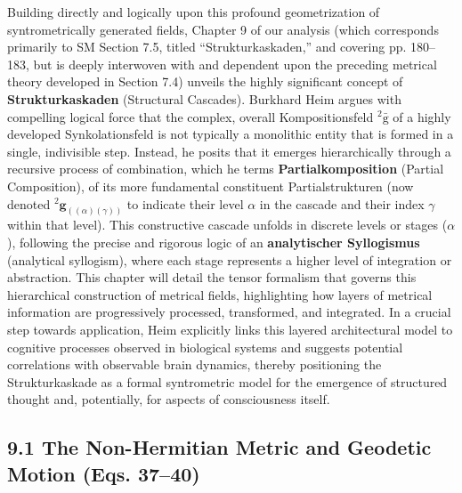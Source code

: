 \documentclass[12pt]{article}
\newcommand{\q}[1]{\enquote{#1}}
\newcommand{\kompositionsfeld}{{}^2\bar{\mathrm{g}}}
\newcommand{\partialstruktur}[1]{{}^2\mathbf{g}_{(#1)}}
\newcommand{\kaskadenstufe}{\alpha}
\begin{document}
Building directly and logically upon this profound geometrization of syntrometrically generated fields, Chapter 9 of our analysis (which corresponds primarily to SM Section 7.5, titled \q{Strukturkaskaden,} and covering pp. 180–183, but is deeply interwoven with and dependent upon the preceding metrical theory developed in Section 7.4) unveils the highly significant concept of \textbf{Strukturkaskaden} (Structural Cascades). Burkhard Heim argues with compelling logical force that the complex, overall Kompositionsfeld \( \kompositionsfeld \) of a highly developed Synkolationsfeld is not typically a monolithic entity that is formed in a single, indivisible step. Instead, he posits that it emerges hierarchically through a recursive process of combination, which he terms \textbf{Partialkomposition} (Partial Composition), of its more fundamental constituent Partialstrukturen (now denoted \( \partialstruktur{(\alpha)(\gamma)} \) to indicate their level \( \alpha \) in the cascade and their index \( \gamma \) within that level). This constructive cascade unfolds in discrete levels or stages (\(\kaskadenstufe\)), following the precise and rigorous logic of an \textbf{analytischer Syllogismus} (analytical syllogism), where each stage represents a higher level of integration or abstraction. This chapter will detail the tensor formalism that governs this hierarchical construction of metrical fields, highlighting how layers of metrical information are progressively processed, transformed, and integrated. In a crucial step towards application, Heim explicitly links this layered architectural model to cognitive processes observed in biological systems and suggests potential correlations with observable brain dynamics, thereby positioning the Strukturkaskade as a formal syntrometric model for the emergence of structured thought and, potentially, for aspects of consciousness itself.

\subsection{9.1 The Non-Hermitian Metric and Geodetic Motion (Eqs. 37--40)}
\label{sec:field_metric_motion}
\end{document}
